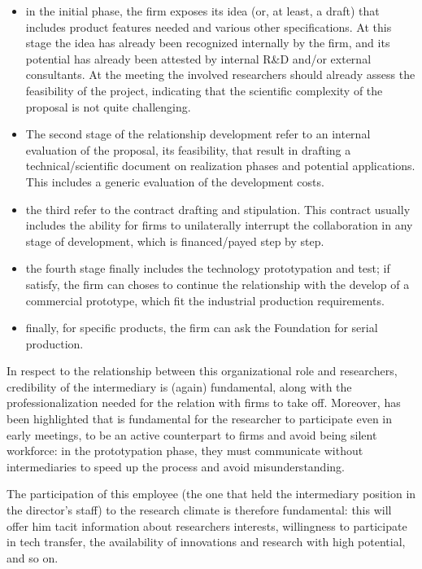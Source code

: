 \begin{itemize}

\item in the initial phase, the firm exposes its idea (or, at least, a draft) that includes product features needed and various other specifications. At this stage the idea has already been recognized internally by the firm, and its potential has already been attested by internal R\&D and/or external consultants. At the meeting the involved researchers should already assess the feasibility of the project, indicating that the scientific complexity of the proposal is not quite challenging.
\item The second stage of the relationship development refer to an internal evaluation of the proposal, its feasibility, that result in drafting a technical/scientific document on realization phases and potential applications. This includes a generic evaluation of the development costs.
\item the third refer to the contract drafting and stipulation. This contract usually includes the ability for firms to unilaterally interrupt the collaboration in any stage of development, which is financed/payed step by step.
\item the fourth stage finally includes the technology prototypation and test; if satisfy, the firm can choses to continue the relationship with the develop of a commercial prototype, which fit the industrial production requirements.
\item finally, for specific products, the firm can ask the Foundation for serial production.

\end{itemize}

In respect to the relationship between this organizational role and researchers, credibility of the intermediary is (again) fundamental, along with the professionalization needed for the relation with firms to take off. Moreover, has been highlighted that is fundamental for the researcher to participate even in early meetings, to be an active counterpart to firms and avoid being silent workforce: in the prototypation phase, they must communicate without intermediaries to speed up the process and avoid misunderstanding. 

The participation of this employee (the one that held the intermediary position in the director’s staff) to the research climate is therefore fundamental: this will offer him tacit information about researchers interests, willingness to participate in tech transfer, the availability of innovations and research with high potential, and so on.

